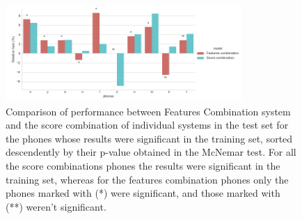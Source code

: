 \begin{figure}[H]
	\centering
	\includegraphics[width=0.8\textwidth]{files/figures/results/relatives/relative-fusion-systems-heldout-mcnemar.png}
	\caption{Comparison of performance between Features Combination system and the score combination
	of individual systems in the test set for the phones whose results were significant
	in the training set, sorted descendently by their p-value obtained in the McNemar test.
	For all the score combinations phones the results were significant in the training set,
	whereas for the features combination phones only the phones marked with (*) were significant,
	and those marked with (**) weren't significant.}
	\label{fig:fusionMcnemarTest}
\end{figure}
